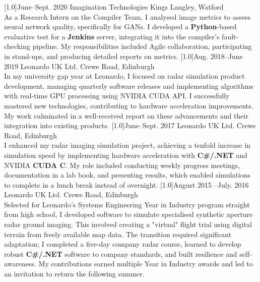\documentclass[]{cv-style}     %
\begin{document}
\begin{entrylist}
{%
}
\entry
  {\scalebox{.8}[1.0]{June--Sept.  2020}}
  {Imagination Technologies}
  {Kings Langley, Watford}
  {\\
As a Research Intern on the Compiler Team, I analysed image metrics to assess neural network quality, specifically for GANs. I developed a \textbf{Python}-based evaluative test for a \textbf{Jenkins} server, integrating it into the compiler's fault-checking pipeline. My responsibilities included Agile collaboration, participating in stand-ups, and producing detailed reports on metrics.
 }
\entry
  {\scalebox{.8}[1.0]{Aug. 2018--June 2019}}
  {Leonardo UK Ltd.}
  {Crewe Road, Edinburgh}
  {\\
  In my university gap year at Leonardo, I focused on radar simulation product development, managing quarterly software releases and implementing algorithms with real-time GPU processing using NVIDIA CUDA API. I successfully mastered new technologies, contributing to hardware acceleration improvements. My work culminated in a well-received report on these advancements and their integration into existing products.
}
\entry
  {\scalebox{.8}[1.0]{June--Sept. 2017}}
  {Leonardo UK Ltd.}
  {Crewe Road, Edinburgh}
  {\\
  I enhanced my radar imaging simulation project, achieving a tenfold increase in simulation speed by implementing hardware acceleration with \textbf{C#/.NET} and NVIDIA \textbf{CUDA C}. My role included conducting weekly progress meetings, documentation in a lab book, and presenting results, which enabled simulations to complete in a lunch break instead of overnight.
}
\entry
  {\scalebox{.8}[1.0]{August 2015 --July.  2016}}
  {Leonardo UK Ltd.}
  {Crewe Road, Edinburgh}
  {\\
 Selected for Leonardo's Systems Engineering Year in Industry program straight from high school, I developed software to simulate specialised synthetic aperture radar ground imaging. This involved creating a "virtual" flight trial using digital terrain from freely available map data. The transition required significant adaptation; I completed a five-day company radar course, learned to develop robust \textbf{C#/.NET} software to company standards, and built resilience and self-awareness. My contributions earned multiple Year in Industry awards and led to an invitation to return the following summer.
}


\end{entrylist}
\end{document}
